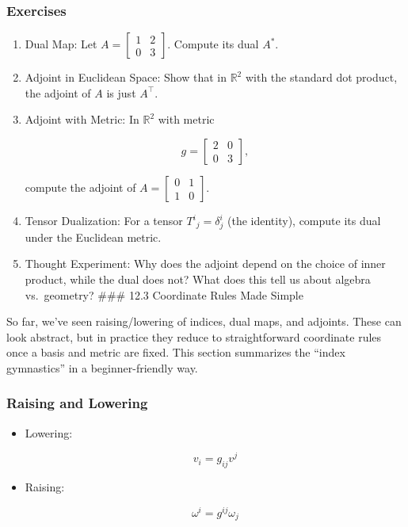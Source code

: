 \documentclass[
  letterpaper,
  DIV=11,
  numbers=noendperiod]{scrreprt}
\begin{document}
\subsubsection{Exercises}\label{exercises-44}

\begin{enumerate}
\def\labelenumi{\arabic{enumi}.}
\item
  Dual Map: Let \(A = \begin{bmatrix}1 & 2 \\ 0 & 3\end{bmatrix}\).
  Compute its dual \(A^*\).
\item
  Adjoint in Euclidean Space: Show that in \(\mathbb{R}^2\) with the
  standard dot product, the adjoint of \(A\) is just \(A^\top\).
\item
  Adjoint with Metric: In \(\mathbb{R}^2\) with metric

  \[
  g = \begin{bmatrix}2 & 0 \\ 0 & 3\end{bmatrix},
  \]

  compute the adjoint of
  \(A = \begin{bmatrix}0 & 1 \\ 1 & 0\end{bmatrix}\).
\item
  Tensor Dualization: For a tensor \(T^i{}_j = \delta^i_j\) (the
  identity), compute its dual under the Euclidean metric.
\item
  Thought Experiment: Why does the adjoint depend on the choice of inner
  product, while the dual does not? What does this tell us about algebra
  vs.~geometry? \#\#\# 12.3 Coordinate Rules Made Simple
\end{enumerate}

So far, we've seen raising/lowering of indices, dual maps, and adjoints.
These can look abstract, but in practice they reduce to straightforward
coordinate rules once a basis and metric are fixed. This section
summarizes the ``index gymnastics'' in a beginner-friendly way.

\subsubsection{Raising and Lowering}\label{raising-and-lowering}

\begin{itemize}
\item
  Lowering:

  \[
  v_i = g_{ij} v^j
  \]
\item
  Raising:

  \[
  \omega^i = g^{ij} \omega_j
  \]
\end{itemize}
\end{document}
